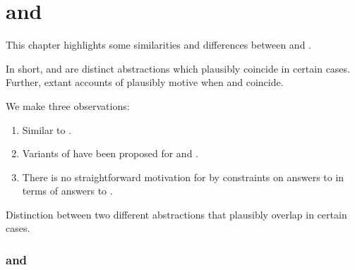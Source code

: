 \chapter{\issueInclusion{} and }
\label{sec:reasons}


\begin{note}
  This chapter highlights some similarities and differences between  and .

  In short,  and  are distinct abstractions which plausibly coincide in certain cases.
  Further, extant accounts of  plausibly motive \issueInclusion{} when  and  coincide.
\end{note}

\begin{note}
  We make three observations:

  \begin{enumerate}
  \item
    Similar to .
  \item
    Variants of \issueInclusion{} have been proposed for \qWhyR{} and \qHow{}.
  \item
    There is no straightforward motivation for \issueInclusion{} by constraints on answers to \qWhyR{} in terms of answers to \qHow{}.
  \end{enumerate}
\end{note}


\begin{note}
  Distinction between two different abstractions that plausibly overlap in certain cases.
\end{note}


\subsection{ and }

